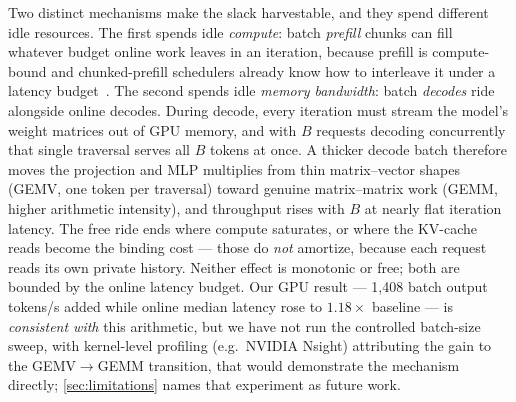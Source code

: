 \documentclass[11pt]{article}
\begin{document}
Two distinct mechanisms make the slack harvestable, and they spend different idle
resources. The first spends idle \emph{compute}: batch \emph{prefill} chunks can fill
whatever budget online work leaves in an iteration, because prefill is compute-bound and
chunked-prefill schedulers already know how to interleave it under a latency
budget~\citep{sarathi}. The second spends idle \emph{memory bandwidth}: batch
\emph{decodes} ride alongside online decodes. During decode, every iteration must
stream the model's weight matrices out of GPU memory, and with $B$ requests decoding
concurrently that single traversal serves all $B$ tokens at once. A thicker decode
batch therefore moves the projection and MLP multiplies from thin matrix--vector shapes
(GEMV, one token per traversal) toward genuine matrix--matrix work (GEMM, higher
arithmetic intensity), and throughput rises with $B$ at nearly flat iteration latency.
The free ride ends where compute saturates, or where the KV-cache reads become the
binding cost --- those do \emph{not} amortize, because each request reads its own
private history. Neither effect is monotonic or free; both are bounded by the online
latency budget. Our GPU result --- 1{,}408 batch output tokens/s added while online
median latency rose to $1.18\times$ baseline --- is \emph{consistent with} this
arithmetic, but we have not run the controlled batch-size sweep, with kernel-level
profiling (e.g.\ NVIDIA Nsight) attributing the gain to the GEMV$\to$GEMM transition,
that would demonstrate the mechanism directly; \cref{sec:limitations} names that
experiment as future work.
\end{document}
